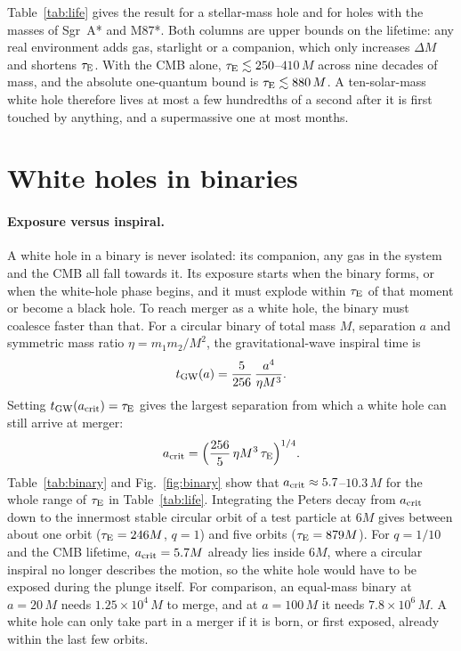 \documentclass[11pt,a4paper]{article}
\newcommand{\dM}{\Delta M}
\newcommand{\tauE}{\tau_{\rm E}}
\begin{document}
Table~\ref{tab:life} gives the result for a stellar-mass hole and for holes with the masses of Sgr~A* and M87*. Both columns are upper bounds on the lifetime: any real environment adds gas, starlight or a companion, which only increases $\dM$ and shortens $\tauE$. With the CMB alone, $\tauE \lesssim 250$--$410\,M$ across nine decades of mass, and the absolute one-quantum bound is $\tauE \lesssim 880\,M$. A ten-solar-mass white hole therefore lives at most a few hundredths of a second after it is first touched by anything, and a supermassive one at most months.

\section{White holes in binaries}\label{sec:binary}

\paragraph{Exposure versus inspiral.} A white hole in a binary is never isolated: its companion, any gas in the system and the CMB all fall towards it. Its exposure starts when the binary forms, or when the white-hole phase begins, and it must explode within $\tauE$ of that moment or become a black hole. To reach merger as a white hole, the binary must coalesce faster than that. For a circular binary of total mass $M$, separation $a$ and symmetric mass ratio $\eta = m_1m_2/M^2$, the gravitational-wave inspiral time is~\cite{Peters1964}
\begin{equation}
t_{\rm GW}(a) = \frac{5}{256}\,\frac{a^4}{\eta M^3}.
\end{equation}
Setting $t_{\rm GW}(a_{\rm crit}) = \tauE$ gives the largest separation from which a white hole can still arrive at merger:
\begin{equation}
a_{\rm crit} = \Big(\frac{256}{5}\,\eta M^3\,\tauE\Big)^{1/4}.
\end{equation}
Table~\ref{tab:binary} and Fig.~\ref{fig:binary} show that $a_{\rm crit} \approx 5.7$--$10.3\,M$ for the whole range of $\tauE$ in Table~\ref{tab:life}. Integrating the Peters decay from $a_{\rm crit}$ down to the innermost stable circular orbit of a test particle at $6M$ gives between about one orbit ($\tauE=246M$, $q=1$) and five orbits ($\tauE=879M$). For $q=1/10$ and the CMB lifetime, $a_{\rm crit}=5.7M$ already lies inside $6M$, where a circular inspiral no longer describes the motion, so the white hole would have to be exposed during the plunge itself. For comparison, an equal-mass binary at $a=20\,M$ needs $1.25\times10^4\,M$ to merge, and at $a=100\,M$ it needs $7.8\times10^6\,M$. A white hole can only take part in a merger if it is born, or first exposed, already within the last few orbits.
\end{document}
